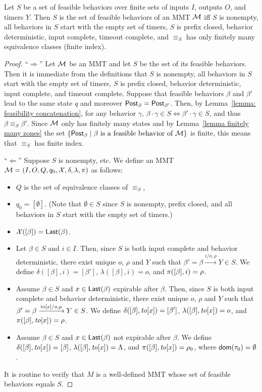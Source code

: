 \begin{theorem}
Let $S$ be a set of feasible behaviors over finite sets of inputs $I$, outputs $O$, and timers $Y$.
Then $S$ is the set of feasible behaviors of an MMT ${\cal M}$ iff $S$ is nonempty, all behaviors in $S$
start with the empty set of timers, $S$ is prefix closed, behavior deterministic, input complete, timeout complete,
and $\equiv_S$ has only finitely many equivalence classes (finite index).
\end{theorem}
\begin{proof}

``$\Rightarrow$'' Let ${\cal M}$ be an MMT and let $S$ be the set of its feasible behaviors.
Then it is immediate from the definitions that $S$ is nonempty, all behaviors in $S$
start with the empty set of timers, $S$ is prefix closed, behavior deterministic, input complete, and timeout complete.
Suppose that feasible behaviors $\beta$ and $\beta'$ lead to the same state $q$ and moreover $\mathsf{Post}_{\beta} = \mathsf{Post}_{\beta'}$.
Then, 
by Lemma~\ref{lemma: feasibility concatenation},
for any behavior $\gamma$, $\beta \cdot \gamma \in S \Leftrightarrow \beta' \cdot \gamma \in S$, and thus
$\beta \equiv_S \beta'$.
Since ${\cal M}$ only has finitely many states and by Lemma~\ref{lemma finitely many zones} the set
$\{ \mathsf{Post}_{\beta} \mid \beta \mbox{ is a feasible behavior of } {\cal M} \}$ is finite, this means that
$\equiv_S$ has finite index.

``$\Leftarrow$'' Suppose $S$ is nonempty, etc.
We define an MMT ${\cal M} = (I, O, Q, q_0, \mathcal{X}, \delta, \lambda, \pi)$ as follows:
\begin{itemize}
\item
$Q$ is the set of equivalence classes of $\equiv_S$,
\item
$q_0 = [\emptyset]$. (Note that $\emptyset \in S$ since $S$ is nonempty, prefix closed, and all behaviors in $S$ start
with the empty set of timers.)
\item
$\mathcal{X}([\beta]) = \mathsf{Last}({\beta})$.
\item
Let $\beta \in S$ and $i \in I$. Then, since $S$ is both input complete and behavior deterministic, there exist unique
$o$, $\rho$ and $Y$ such that $\beta' = \beta \xrightarrow{i/o, \rho} Y \in S$.
We define $\delta([\beta],i) = [\beta']$, $\lambda([\beta],i) = o$, and $\pi([\beta],i) = \rho$.
\item
Assume $\beta \in S$ and $x\in \mathsf{Last}({\beta})$ expirable after $\beta$. 
Then, since $S$ is both input complete and behavior deterministic, there exist unique
$o$, $\rho$ and $Y$ such that $\beta' = \beta \xrightarrow{\mathit{to}[x]/o, \rho} Y \in S$.
We define $\delta([\beta],\mathit{to}[x]) = [\beta']$, $\lambda([\beta],\mathit{to}[x]) = o$, and $\pi([\beta],\mathit{to}[x]) = \rho$.
\item
Assume $\beta \in S$ and $x \in \mathsf{Last}({\beta})$ not expirable after $\beta$.
We define $\delta([\beta],\mathit{to}[x]) = [\beta]$, $\lambda([\beta],\mathit{to}[x]) = \Lambda$, and $\pi([\beta],\mathit{to}[x]) = \rho_0$, where ${\textsf{dom}}(\tau_0) = \emptyset$.
\end{itemize}
It is routine to verify that $M$ is a well-defined MMT whose set of feasible behaviors equals $S$.
\end{proof}



